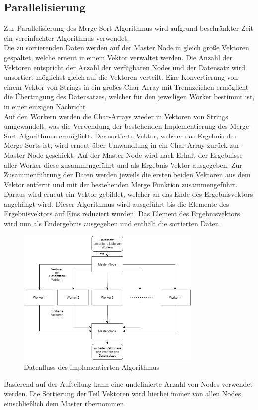 \subsection{Parallelisierung}
Zur Parallelisierung des Merge-Sort Algorithmus wird aufgrund beschränkter Zeit ein vereinfachter Algorithmus verwendet.\\
Die zu sortierenden Daten werden auf der Master Node in gleich große Vektoren gespaltet, welche erneut in einem Vektor verwaltet werden. Die Anzahl der Vektoren entspricht der Anzahl der verfügbaren Nodes und der Datensatz wird unsortiert möglichst gleich auf die Vektoren verteilt. Eine Konvertierung von einem Vektor von Strings in ein großes Char-Array mit Trennzeichen ermöglicht die Übertragung des Datensatzes, welcher für den jeweiligen Worker bestimmt ist, in einer einzigen Nachricht. 
\\
Auf den Workern werden die Char-Arrays wieder in Vektoren von Strings umgewandelt, was die Verwendung der bestehenden Implementierung des Merge-Sort Algorithmus ermöglicht. Der sortierte Vektor, welcher das Ergebnis des Merge-Sorts ist, wird erneut über Umwandlung in ein Char-Array zurück zur Master Node geschickt. Auf der Master Node wird nach Erhalt der Ergebnisse aller Worker diese zusammengeführt und als Ergebnis Vektor ausgegeben. Zur Zusammenführung der Daten werden jeweils die ersten beiden Vektoren aus dem Vektor entfernt und mit der bestehenden Merge Funktion zusammengeführt. Daraus wird erneut ein Vektor gebildet, welcher an das Ende des Ergebnisvektors angehängt wird. Dieser Algorithmus wird ausgeführt bis die Elemente des Ergebnisvektors auf Eins reduziert wurden. Das Element des Ergebnisvektors wird nun als Endergebnis ausgegeben und enthält die sortierten Daten. 
\\
\begin{figure}[!t]
	\centering
	\includegraphics[width=3.5in]{Parallelisierungs_Algorithmus.png}
	\caption{Datenfluss des implementierten Algorithmus}
	\label{para_algo1}
\end{figure}
Basierend auf der Aufteilung kann eine undefinierte Anzahl von Nodes verwendet werden. Die Sortierung der Teil Vektoren wird hierbei immer von allen Nodes einschließlich dem Master übernommen.
\\

